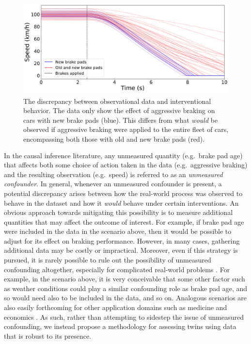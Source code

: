 \begin{figure}
    \centering
    \includegraphics[height=5cm]{figures/causal/synthetic_example_newest2_nogray.pdf}

    \caption{The discrepancy between observational data and interventional behavior. The data only show the effect of aggressive braking on cars with new brake pads (blue). This differs from what \emph{would} be observed if aggressive braking were applied to the entire fleet of cars, encompassing both those with old and new brake pads (red).}
    
    \label{fig:syn_ex}
\end{figure}

In the causal inference literature, any unmeasured quantity (e.g.\ brake pad age) that affects both some choice of action taken in the data (e.g.\ aggressive braking) and the resulting observation (e.g.\ speed) is referred to as an \emph{unmeasured confounder}.
In general, whenever an unmeasured confounder is present, a potential discrepancy arises between how the real-world process was observed to behave in the dataset and how it \emph{would} behave under certain interventions.
An obvious approach towards mitigating this possibility is to measure additional quantities that may affect the outcome of interest.
For example, if brake pad age were included in the data in the scenario above, then it would be possible to adjust for its effect on braking performance. 
However, in many cases, gathering additional data may be costly or impractical.
Moreover, even if this strategy is pursued, it is rarely possible to rule out the possibility of unmeasured confounding altogether, especially for complicated real-world problems \cite{tsiatis2019dynamic}. 
For example, in the scenario above, it is very conceivable that some other factor such as weather conditions could play a similar confounding role as brake pad age, and so would need also to be included in the data, and so on.
Analogous scenarios are also easily forthcoming for other application domains such as medicine and economics \cite{manski1995identification,tsiatis2019dynamic,hernan2020causal}.
%
As such, rather than attempting to sidestep the issue of unmeasured confounding, we instead propose a methodology for assessing twins using data that is robust to its presence. %

%
%
%
%
%


